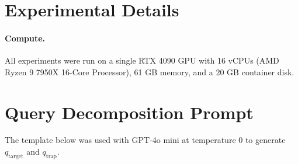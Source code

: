 \documentclass[11pt]{article}
\begin{document}
\clearpage
\appendix

\section{Experimental Details}

\paragraph{Compute.}
All experiments were run on a single RTX 4090 GPU with 16 vCPUs (AMD Ryzen 9 7950X 16-Core Processor), 61 GB memory, and a 20 GB container disk.

\section{Query Decomposition Prompt}
\label{sec:appendix-decomposition-prompt}

The template below was used with GPT-4o mini at temperature 0 to generate
$q_{\mathrm{target}}$ and $q_{\mathrm{trap}}$.
\end{document}
